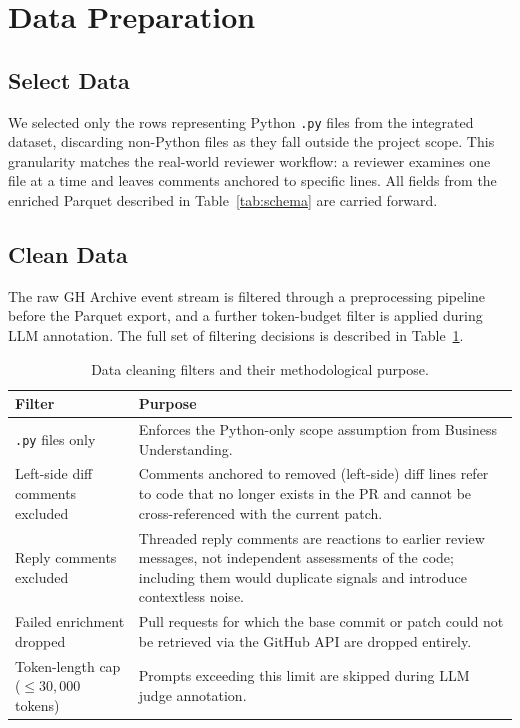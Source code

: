 \documentclass[11pt]{article}
\begin{document}
\section*{Data Preparation}

\subsection*{Select Data}

We selected only the rows representing Python \texttt{.py} files from the integrated dataset, discarding non-Python files as they fall outside the project scope. This granularity matches the real-world reviewer workflow: a reviewer examines one file at a time and leaves comments anchored to specific lines. All fields from the enriched Parquet described in Table~\ref{tab:schema} are carried forward.

\subsection*{Clean Data}

The raw GH Archive event stream is filtered through a preprocessing pipeline before the Parquet export, and a further token-budget filter is applied during LLM annotation. The full set of filtering decisions is described in Table~\ref{tab:data_cleaning}.

\begin{table}[H]
\centering
\caption{Data cleaning filters and their methodological purpose.}
\label{tab:data_cleaning}
\begin{tabular}{@{}p{4.5cm}p{9cm}@{}}
\toprule
\textbf{Filter} & \textbf{Purpose} \\ \midrule
\texttt{.py} files only & Enforces the Python-only scope assumption from Business Understanding. \\ \midrule
Left-side diff comments excluded & Comments anchored to removed (left-side) diff lines refer to code that no longer exists in the PR and cannot be cross-referenced with the current patch. \\ \midrule
Reply comments excluded & Threaded reply comments are reactions to earlier review messages, not independent assessments of the code; including them would duplicate signals and introduce contextless noise. \\ \midrule
Failed enrichment dropped & Pull requests for which the base commit or patch could not be retrieved via the GitHub API are dropped entirely. \\ \midrule
Token-length cap ($\leq 30{,}000$ tokens) & Prompts exceeding this limit are skipped during LLM judge annotation.\\ \bottomrule
\end{tabular}
\end{table}
\end{document}
